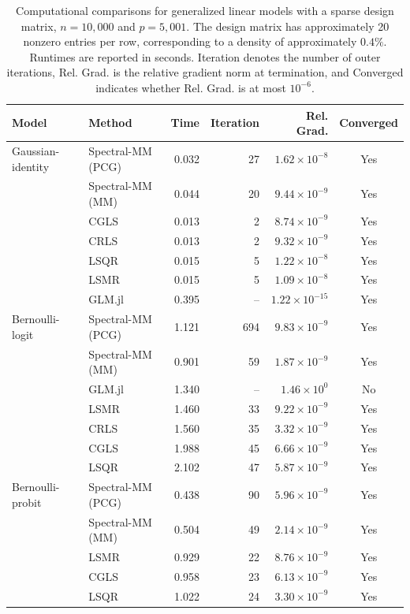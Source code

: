 \begin{table}[htbp]
\centering
\caption{
Computational comparisons for generalized linear models with a sparse design matrix,
$n=10{,}000$ and $p=5{,}001$.
The design matrix has approximately 20 nonzero entries per row,
corresponding to a density of approximately $0.4\%$.
Runtimes are reported in seconds.
Iteration denotes the number of outer iterations,
Rel. Grad. is the relative gradient norm at termination,
and Converged indicates whether Rel. Grad. is at most $10^{-6}$.
}
\label{tab:glm-comparison-sparse}
\begin{tabular}{llrrrc}
\toprule
Model & Method & Time & Iteration & Rel. Grad. & Converged \\
\midrule
Gaussian-identity & Spectral-MM (PCG) & 0.032 & 27 & $1.62\times10^{-8}$ & Yes \\
 & Spectral-MM (MM) & 0.044 & 20 & $9.44\times10^{-9}$ & Yes \\
 & CGLS & 0.013 & 2 & $8.74\times10^{-9}$ & Yes \\
 & CRLS & 0.013 & 2 & $9.32\times10^{-9}$ & Yes \\
 & LSQR & 0.015 & 5 & $1.22\times10^{-8}$ & Yes \\
 & LSMR & 0.015 & 5 & $1.09\times10^{-8}$ & Yes \\
 & GLM.jl & 0.395 & -- & $1.22\times10^{-15}$ & Yes \\
\midrule
Bernoulli-logit & Spectral-MM (PCG) & 1.121 & 694 & $9.83\times10^{-9}$ & Yes \\
 & Spectral-MM (MM) & 0.901 & 59 & $1.87\times10^{-9}$ & Yes \\
 & GLM.jl & 1.340 & -- & $1.46\times10^{0}$ & No \\
 & LSMR & 1.460 & 33 & $9.22\times10^{-9}$ & Yes \\
 & CRLS & 1.560 & 35 & $3.32\times10^{-9}$ & Yes \\
 & CGLS & 1.988 & 45 & $6.66\times10^{-9}$ & Yes \\
 & LSQR & 2.102 & 47 & $5.87\times10^{-9}$ & Yes \\
\midrule
Bernoulli-probit & Spectral-MM (PCG) & 0.438 & 90 & $5.96\times10^{-9}$ & Yes \\
 & Spectral-MM (MM) & 0.504 & 49 & $2.14\times10^{-9}$ & Yes \\
 & LSMR & 0.929 & 22 & $8.76\times10^{-9}$ & Yes \\
 & CGLS & 0.958 & 23 & $6.13\times10^{-9}$ & Yes \\
 & LSQR & 1.022 & 24 & $3.30\times10^{-9}$ & Yes \\

\end{tabular}
\end{table}
